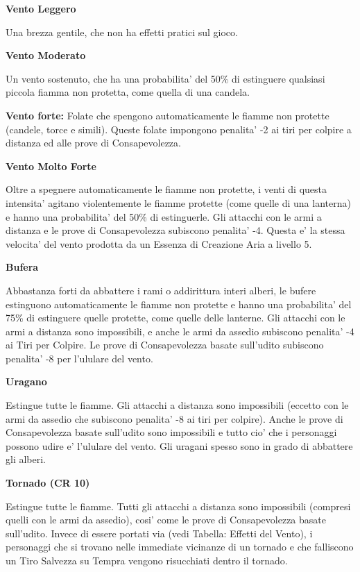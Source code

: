 \documentclass[a4paper,11pt,twoside,openany]{book}
\begin{document}
{\bigskip

\textbf{Vento Leggero}

Una brezza gentile, che non ha effetti pratici sul gioco.

\textbf{Vento Moderato}

Un vento sostenuto, che ha una probabilita' del 50\% di estinguere qualsiasi piccola fiamma non protetta, come quella di una candela.

\textbf{Vento forte:} Folate che spengono automaticamente le fiamme non protette (candele, torce e simili). Queste folate impongono penalita' -2 ai tiri per colpire a distanza ed alle prove di Consapevolezza.

\textbf{Vento Molto Forte}

Oltre a spegnere automaticamente le fiamme non protette, i venti di questa intensita' agitano violentemente le fiamme protette (come quelle di una lanterna) e hanno una probabilita' del 50\% di estinguerle. Gli attacchi con le armi a distanza e le prove di Consapevolezza subiscono penalita' -4. Questa e' la stessa velocita' del vento prodotta da un Essenza di Creazione Aria a livello 5.

\textbf{Bufera}

Abbastanza forti da abbattere i rami o addirittura interi alberi, le bufere estinguono automaticamente le fiamme non protette e hanno una probabilita' del 75\% di estinguere quelle protette, come quelle delle lanterne. Gli attacchi con le armi a distanza sono impossibili, e anche le armi da assedio subiscono penalita' -4 ai Tiri per Colpire. Le prove di Consapevolezza basate sull'udito subiscono penalita' -8 per l'ululare del vento.

\textbf{Uragano}

Estingue tutte le fiamme. Gli attacchi a distanza sono impossibili (eccetto con le armi da assedio che subiscono penalita' -8 ai tiri per colpire). Anche le prove di Consapevolezza basate sull'udito sono impossibili e tutto cio' che i personaggi possono udire e' l'ululare del vento. Gli uragani spesso sono in grado di abbattere gli alberi.

\textbf{Tornado (CR 10)}

Estingue tutte le fiamme. Tutti gli attacchi a distanza sono impossibili (compresi quelli con le armi da assedio), cosi' come le prove di Consapevolezza basate sull'udito. Invece di essere portati via (vedi Tabella: Effetti del Vento), i personaggi che si trovano nelle immediate vicinanze di un tornado e che falliscono un Tiro Salvezza su Tempra vengono risucchiati dentro il tornado.

}
\end{document}
